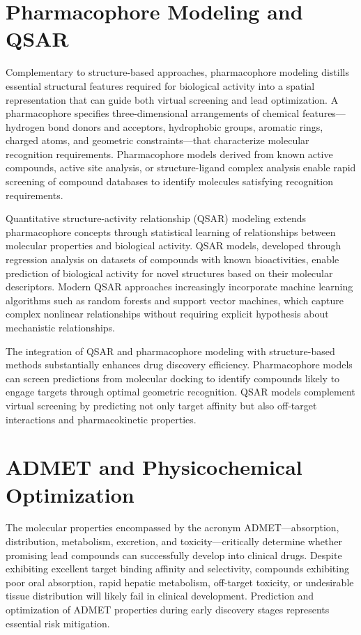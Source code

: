 \documentclass[12pt,a4paper]{article}
\begin{document}
\section*{Pharmacophore Modeling and QSAR}

Complementary to structure-based approaches, pharmacophore modeling distills essential structural features required for biological activity into a spatial representation that can guide both virtual screening and lead optimization. A pharmacophore specifies three-dimensional arrangements of chemical features—hydrogen bond donors and acceptors, hydrophobic groups, aromatic rings, charged atoms, and geometric constraints—that characterize molecular recognition requirements. Pharmacophore models derived from known active compounds, active site analysis, or structure-ligand complex analysis enable rapid screening of compound databases to identify molecules satisfying recognition requirements.

Quantitative structure-activity relationship (QSAR) modeling extends pharmacophore concepts through statistical learning of relationships between molecular properties and biological activity. QSAR models, developed through regression analysis on datasets of compounds with known bioactivities, enable prediction of biological activity for novel structures based on their molecular descriptors. Modern QSAR approaches increasingly incorporate machine learning algorithms such as random forests and support vector machines, which capture complex nonlinear relationships without requiring explicit hypothesis about mechanistic relationships.

The integration of QSAR and pharmacophore modeling with structure-based methods substantially enhances drug discovery efficiency. Pharmacophore models can screen predictions from molecular docking to identify compounds likely to engage targets through optimal geometric recognition. QSAR models complement virtual screening by predicting not only target affinity but also off-target interactions and pharmacokinetic properties.

\section*{ADMET and Physicochemical Optimization}

The molecular properties encompassed by the acronym ADMET—absorption, distribution, metabolism, excretion, and toxicity—critically determine whether promising lead compounds can successfully develop into clinical drugs. Despite exhibiting excellent target binding affinity and selectivity, compounds exhibiting poor oral absorption, rapid hepatic metabolism, off-target toxicity, or undesirable tissue distribution will likely fail in clinical development. Prediction and optimization of ADMET properties during early discovery stages represents essential risk mitigation.
\end{document}
